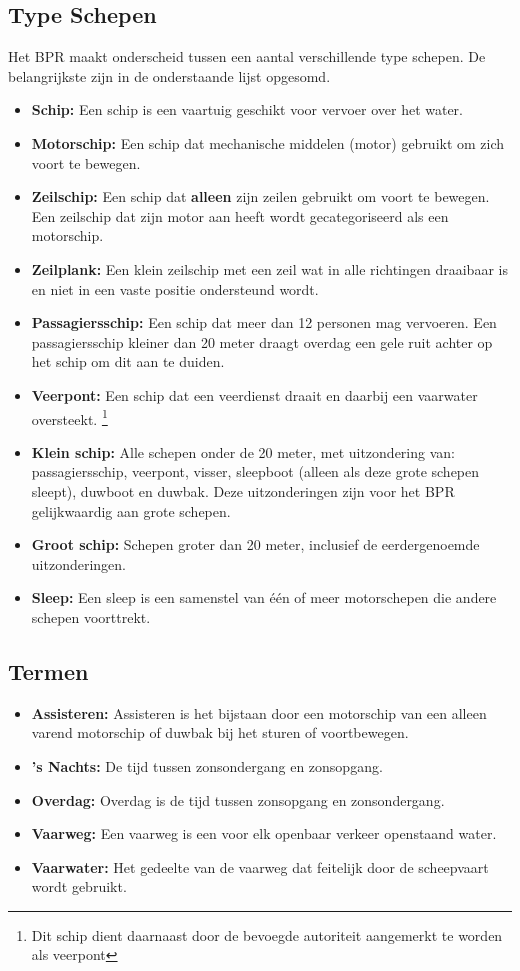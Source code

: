 \subsection{Type Schepen}
Het BPR maakt onderscheid tussen een aantal verschillende type schepen. De belangrijkste zijn in de onderstaande lijst opgesomd.
\begin{itemize}
	\item \textbf{Schip:} Een schip is een vaartuig geschikt voor vervoer over het water.
    \item \textbf{Motorschip:} Een schip dat mechanische middelen (motor) gebruikt om zich voort te bewegen.
    \item \textbf{Zeilschip:} Een schip dat \textbf{alleen} zijn zeilen gebruikt om voort te bewegen. Een zeilschip dat zijn motor aan heeft wordt gecategoriseerd als een motorschip.
    \item \textbf{Zeilplank:} Een klein zeilschip met een zeil wat in alle richtingen draaibaar is en niet in een vaste positie ondersteund wordt.
    \item \textbf{Passagiersschip:} Een schip dat meer dan 12 personen mag vervoeren. Een passagiersschip kleiner dan 20 meter draagt overdag een gele ruit achter op het schip om dit aan te duiden. 
    \item \textbf{Veerpont:} Een schip dat een veerdienst draait en daarbij een vaarwater oversteekt. \footnote{Dit schip dient daarnaast door de bevoegde autoriteit aangemerkt te worden als veerpont}
    \item \textbf{Klein schip:} Alle schepen onder de 20 meter, met uitzondering van: passagiersschip, veerpont, visser, sleepboot
(alleen als deze grote schepen sleept), duwboot en duwbak. Deze uitzonderingen zijn voor het BPR gelijkwaardig aan grote schepen. 
    \item \textbf{Groot schip:} Schepen groter dan 20 meter, inclusief de eerdergenoemde uitzonderingen. 
    \item \textbf{Sleep:} Een sleep is een samenstel van één of meer motorschepen die andere schepen voorttrekt. 
\end{itemize}

\newpage
\subsection{Termen}
	\begin{itemize}
		\item \textbf{Assisteren:} Assisteren is het bijstaan door een motorschip van een alleen varend motorschip of duwbak bij het sturen of voortbewegen.
		\item \textbf{'s Nachts:} De tijd tussen zonsondergang en zonsopgang.
		\item \textbf{Overdag:} Overdag is de tijd tussen zonsopgang en zonsondergang.
		\item \textbf{Vaarweg:} Een vaarweg is een voor elk openbaar verkeer openstaand water.
		\item \textbf{Vaarwater:} Het gedeelte van de vaarweg dat feitelijk door de scheepvaart wordt  gebruikt.
	\end{itemize}

